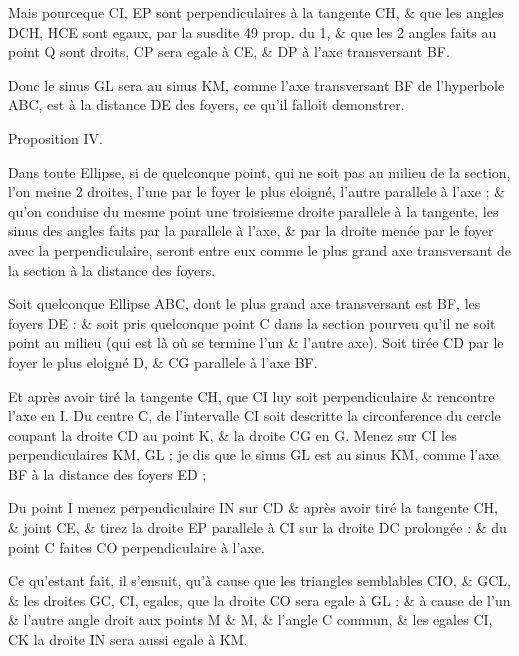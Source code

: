 \documentclass[11pt,a4paper]{article}
\begin{document}
Mais pourceque CI, EP sont perpendiculaires à la tangente CH, \& que les angles DCH, HCE sont egaux, par la susdite 49 prop. du 1, \& que les 2 angles faits au point Q sont droits, CP sera egale à CE, \& DP à l'axe transversant BF. 

Donc le sinus GL sera au sinus KM, comme l'axe transversant BF de l'hyperbole ABC, est à la distance  DE des foyers, ce qu'il falloit demonstrer.

Proposition IV.

Dans toute Ellipse, si de quelconque point, qui ne soit pas au milieu de la section, l'on meine 2 droites, l'une par le foyer le plus eloigné, l'autre parallele à l'axe ; \& qu'on conduise  du mesme point une troisiesme droite  parallele à la tangente, les sinus des angles faits par la parallele à l'axe, \& par la droite menée par le foyer avec la perpendiculaire, seront entre eux comme  le plus grand axe transversant de la section à la distance des foyers.

Soit quelconque Ellipse ABC, dont  le plus grand axe transversant est BF, les foyers DE : \& soit pris quelconque point C dans la section pourveu qu'il ne soit point au milieu (qui est là où se termine l'un \& l'autre axe). Soit tirée CD par le foyer le plus eloigné D, \& CG parallele à l'axe BF.

Et après avoir tiré la tangente CH,  que CI luy soit perpendiculaire \struck{\ill{}} \& rencontre l'axe en I. Du centre C, de l'intervalle CI soit descritte la circonference du cercle coupant la droite CD au point K, \& la droite CG en G. Menez sur CI les perpendiculaires KM, GL ; je dis que le sinus GL est au sinus KM, comme l'axe BF à la distance des foyers ED ;

Du point I menez   perpendiculaire IN sur CD \& après avoir tiré la tangente CH, \& joint CE,  \& tirez la droite EP parallele à CI sur la droite DC prolongée : \& du point C faites CO perpendiculaire à l'axe.

Ce qu'estant fait, il s'ensuit, qu'à cause que les triangles semblables CIO, \& GCL, \& les droites GC, CI, egales, que la droite CO sera egale à GL : \& à cause de l'un \& l'autre angle droit aux points M \& M, \& l'angle C commun, \& les egales CI, CK la droite IN sera aussi egale à KM.
\end{document}
